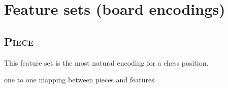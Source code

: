 \newcommand{\white}{\fullmoon}
\newcommand{\black}{\newmoon}

\newcommand{\bigtimes}{\mathop{\raisebox{-0.5ex}{\scalebox{2}{$\times$}}}}

\newcommand{\pieceBoard}{
    \newcount\pieceindex
    \setcounter{pieceindex}{0}
    \raisebox{-7ex}{
        \centering
        \chessboard[
            tinyboard,
            showmover=false,
            margin=false,
            padding=false,
            hlabel=false,
            vlabel=false,
            pgfstyle={text},
            text=\fontsize{1.2ex}{1.2ex}\bfseries\sffamily \thepieceindex \stepcounter{pieceindex}, %
            markboard
        ]
    }
}
\newcommand{\pieceRolesTable}{
    \begin{tabular}{|l|}
        \hline
        \sympawn\ Pawn \\
        \hline
        \symknight\ Knight \\
        \hline
        \symbishop\ Bishop \\
        \hline
        \symrook\ Rook \\
        \hline
        \symqueen\ Queen \\
        \hline
        \symking\ King \\
        \hline
    \end{tabular}
}
\newcommand{\pieceColorsTable}{
    \begin{tabular}{|l|}
        \hline
        $\white$ White \\
        \hline
        $\black$ Black \\
        \hline
    \end{tabular}
}

\newcommand{\fs}[1]{\textsc{#1}}



\section{Feature sets (board encodings)}


\subsection{\mdseries\fs{Piece}}

This feature set is the most natural encoding for a chess position. 

one to one mapping between pieces and features

